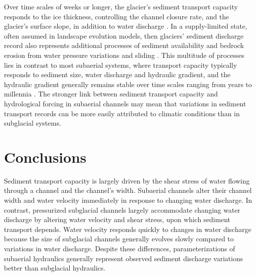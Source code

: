 \documentclass[11pt]{article}
\begin{document}
Over time scales of weeks or longer, the glacier's sediment transport capacity responds to the ice thickness, controlling the channel closure rate, and the glacier's surface slope, in addition to water discharge \citep[Figure~\ref{fig:multi_run}, ~ Section~\ref{sect:sub_mode}; ][]{rothlisberger1972,shreve1972,gimbert2016,stevens2022}.
In a supply-limited state, often assumed in landscape evolution models, then glaciers' sediment discharge record also represents additional processes of sediment availability and bedrock erosion from  water pressure variations and sliding  \citep[e.g.][]{iverson2012,herman2015,delaney2023}.
This multitude of processes lies in contrast to most subaerial systems, where transport capacity typically responds to sediment size, water discharge and hydraulic gradient, and the hydraulic gradient generally remains stable over time scales ranging from years to millennia \citep[Section~\ref{sect:fluv}; e.g.][]{muller1968,tucker1997,wickert2019}.
The stronger link between sediment transport capacity and hydrological forcing in subaerial channels may mean that variations in sediment transport records can be more easily attributed to climatic conditions than in subglacial systems.

\section{Conclusions}

Sediment transport capacity is largely driven by the shear stress of water flowing through a channel and the channel's width.
Subaerial channels  alter their channel width and water velocity immediately in response to changing water discharge.
In contrast, pressurized subglacial channels largely accommodate changing water discharge by altering water velocity and shear stress, upon which sediment transport depends.
Water velocity responds quickly to changes in water discharge because the size of subglacial channels generally evolves slowly compared to variations in water discharge.
Despite these differences, parameterizations of subaerial hydraulics generally represent observed sediment discharge variations better than subglacial hydraulics.
\end{document}
